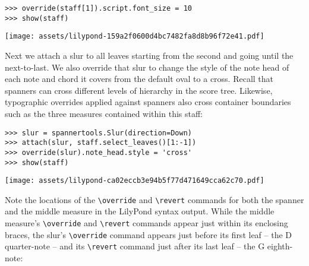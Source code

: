 \begin{abjadbookoutput}
\begin{singlespacing}
\vspace{-0.5\baselineskip}
\begin{lstlisting}
>>> override(staff[1]).script.font_size = 10
>>> show(staff)
\end{lstlisting}
\noindent\texttt{[image: assets/lilypond-159a2f0600d4bc7482fa8d8b96f72e41.pdf]}
\end{singlespacing}
\end{abjadbookoutput}

\noindent Next we attach a slur to all leaves starting from the second and
going until the next-to-last. We also override that slur to change the style of
the note head of each note and chord it covers from the default oval to a
cross. Recall that spanners can cross different levels of hierarchy in the
score tree. Likewise, typographic overrides applied against spanners also
cross container boundaries such as the three measures contained within this
staff:

\begin{comment}
<abjad>
slur = spannertools.Slur(direction=Down)
attach(slur, staff.select_leaves()[1:-1])
override(slur).note_head.style = 'cross'
show(staff)
</abjad>
\end{comment}

\begin{abjadbookoutput}
\begin{singlespacing}
\vspace{-0.5\baselineskip}
\begin{lstlisting}
>>> slur = spannertools.Slur(direction=Down)
>>> attach(slur, staff.select_leaves()[1:-1])
>>> override(slur).note_head.style = 'cross'
>>> show(staff)
\end{lstlisting}
\noindent\texttt{[image: assets/lilypond-ca02eccb3e94b5f77d471649cca62c70.pdf]}
\end{singlespacing}
\end{abjadbookoutput}

\noindent Note the locations of the \texttt{\textbackslash{}override} and
\texttt{\textbackslash{}revert} commands for both the spanner and the middle
measure in the LilyPond syntax output. While the middle measure's
\texttt{\textbackslash{}override} and \texttt{\textbackslash{}revert} commands
appear just within its enclosing braces, the slur's
\texttt{\textbackslash{}override} command appears just before its first leaf --
the D quarter-note -- and its \texttt{\textbackslash{}revert} command just
after its last leaf -- the G eighth-note:

